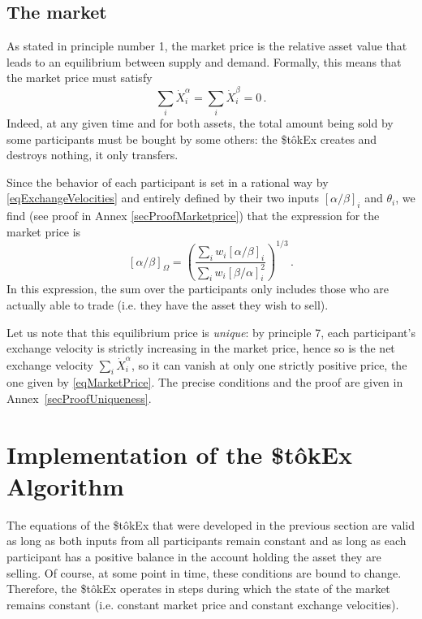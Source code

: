 \documentclass[letterpaper]{article}
\newcommand{\priceAB}{\left[\alpha / \beta\right]}
\newcommand{\priceBA}{\left[\beta / \alpha\right]}
\newcommand{\StokEx}{\$t\^{o}kEx}
\begin{document}
\subsection{The market}\label{secMarketPrice}

As stated in principle number 1, the market price is the relative asset value that leads to an equilibrium between supply and demand. Formally, this means that the market price must satisfy
\begin{equation}
    \sum_i \dot{X}_i^\alpha = \sum_i \dot{X}_i^\beta = 0 \,. \label{eqEquilibrium}
\end{equation}
Indeed, at any given time and for both assets, the total amount being sold by some participants must be bought by some others: the \StokEx{} creates and destroys nothing, it only transfers.

Since the behavior of each participant is set in a rational way by \eqref{eqExchangeVelocities} and entirely defined by their two inputs $\priceAB_i$ and $\theta_i$, we find (see proof in Annex \ref{secProofMarketprice}) that the expression for the market price is
\begin{equation}
    \priceAB_\Omega = \left( \frac{\displaystyle \sum_i w_i \priceAB_i}{\displaystyle \sum_i w_i \priceBA_i^2}\right)^{1/3}\,. \label{eqMarketPrice}
\end{equation}
In this expression, the sum over the participants only includes those who are actually able to trade (i.e. they have the asset they wish to sell).

Let us note that this equilibrium price is \emph{unique}: by principle 7, each participant's exchange velocity is strictly increasing in the market price, hence so is the net exchange velocity $\sum_i \dot{X}_i^\alpha$, so it can vanish at only one strictly positive price, the one given by \eqref{eqMarketPrice}. The precise conditions and the proof are given in Annex~\ref{secProofUniqueness}.

\clearpage

\section{Implementation of the \StokEx{} Algorithm}

The equations of the \StokEx{} that were developed in the previous section are valid as long as both inputs from all participants remain constant and as long as each participant has a positive balance in the account holding the asset they are selling. Of course, at some point in time, these conditions are bound to change. Therefore, the \StokEx{} operates in steps during which the state of the market remains constant (i.e. constant market price and constant exchange velocities).
\end{document}

